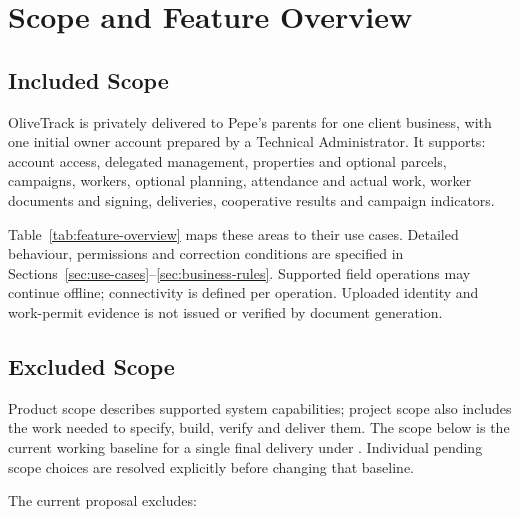 \section{Scope and Feature Overview}
\label{sec:scope}

\subsection{Included Scope}
OliveTrack is privately delivered to Pepe's parents for one client business, with
one initial owner account prepared by a Technical Administrator. It supports:
account access, delegated management, properties and optional parcels, campaigns,
workers, optional planning, attendance and actual work, worker documents and signing,
deliveries, cooperative results and campaign indicators.

Table~\ref{tab:feature-overview} maps these areas to their use cases. Detailed
behaviour, permissions and correction conditions are specified in
Sections~\ref{sec:use-cases}--\ref{sec:business-rules}. Supported field operations
may continue offline; connectivity is defined per operation. Uploaded identity and
work-permit evidence is not issued or verified by document generation.

\subsection{Excluded Scope}

Product scope describes supported system capabilities; project scope also
includes the work needed to specify, build, verify and deliver them. The scope
below is the current working baseline for a single final delivery under
. Individual pending scope choices are resolved explicitly
before changing that baseline.

The current proposal excludes:

